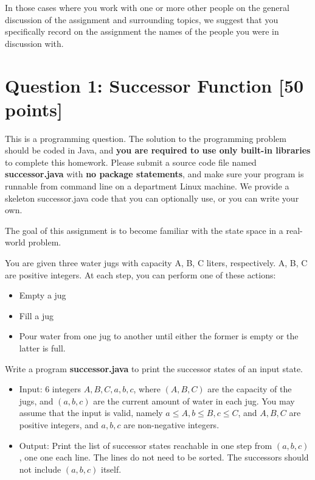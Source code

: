 \documentclass{article}
\begin{document}
In those cases where you work with one or more other people on the general discussion of the assignment and surrounding topics, we suggest that you 
specifically record on the assignment the names of the people you were in discussion with.

\newpage


\section*{Question 1: Successor Function [50 points]}
This is a programming question. The solution to the programming problem should be coded in Java, and \textbf{you are required to use only built-in libraries} to complete this homework. Please submit a source code file named \textbf{successor.java} with \textbf{no package statements}, and make sure your program is runnable from command line on a department Linux machine.  We provide a skeleton successor.java code that you can optionally use, or you can write your own.

The goal of this assignment is to become familiar with the state space in a real-world problem.

\noindent You are given three water jugs with capacity A, B, C liters, respectively.   A, B, C are positive integers.
At each step, you can perform one of these actions:
\begin{itemize}
 \setlength{\topsep}{0pt}
 \setlength{\itemsep}{0pt}
 \setlength{\parskip}{0pt}
 \setlength{\parsep}{0pt}
 \item Empty a jug
 \item Fill a jug
 \item Pour water from one jug to another until either the former is empty or the latter is full.
\end{itemize}

\noindent Write a program \textbf{successor.java} to print the successor states of an input state.
\begin{itemize}
 \setlength{\topsep}{0pt}
 \setlength{\itemsep}{0pt}
 \setlength{\parskip}{0pt}
 \setlength{\parsep}{0pt}
 \item Input: 6 integers $A, B, C, a, b, c$, where $(A, B, C)$ are the capacity of the jugs, and $(a, b, c)$ are the current amount of water in each jug.  You may assume that the input is valid, namely $a\le A, b\le B, c\le C$, and $A, B, C$ are positive integers, and $a, b, c$ are non-negative integers.   
 \item Output: Print the list of successor states reachable in one step from $(a,b,c)$, one one each line.  The lines do not need to be sorted.  The successors should not include $(a,b,c)$ itself.
\end{itemize}
\end{document}
